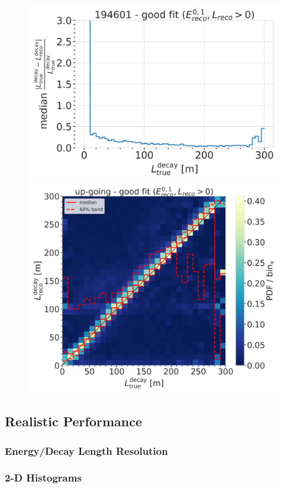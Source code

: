 \begin{figure}[h]
	\centering
    \includegraphics[width=0.49\linewidth]{figures/model_independent_simulation/results/idealistic/194601_median_decay_length_resolution_goodfit_log_unweighted.png}
    \includegraphics[width=0.49\linewidth]{figures/model_independent_simulation/results/idealistic/194601_reco_decay_length_vs_true_decay_length_goodfit_step_contours.png}
    \caption[]{}
\end{figure}



\subsection{Realistic Performance}

\subsubsection{Energy/Decay Length Resolution}


\subsubsection{2-D Histograms}

